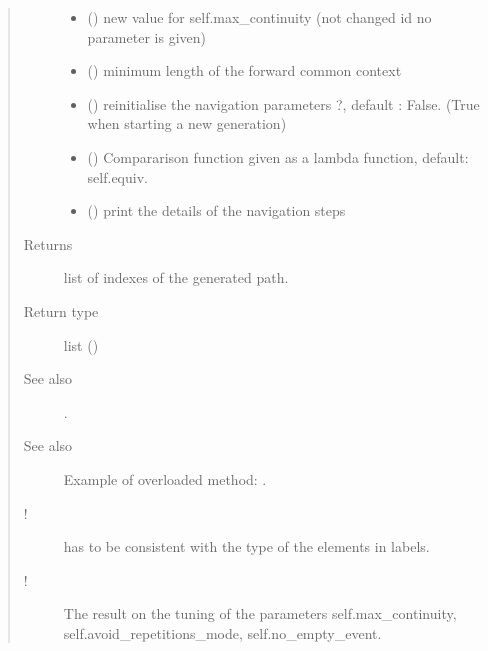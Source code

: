 \documentclass[letterpaper,10pt,english]{sphinxmanual}
\begin{document}
\begin{fulllineitems}
\begin{fulllineitems}
\begin{quote}
\begin{description}
\begin{itemize}
\item {} 
 () \textendash{} new value for self.max\_continuity (not changed id no parameter is given)

\item {} 
 () \textendash{} minimum length of the forward common context

\item {} 
 () \textendash{} reinitialise the navigation parameters ?, default : False. (True when starting a new generation)

\item {} 
 () \textendash{} Compararison function given as a lambda function, default: self.equiv.

\item {} 
 () \textendash{} print the details of the navigation steps

\end{itemize}

\item[{Returns}] \leavevmode
list of indexes of the generated path.

\item[{Return type}] \leavevmode
list ()

\item[{See also}] \leavevmode
{\hyperref[\detokenize{index:Navigator.Navigator.free_generation}]{}}.

\item[{See also}] \leavevmode
Example of overloaded method: .

\item[{!}] \leavevmode
{} has to be consistent with the type of the elements in labels.

\item[{!}] \leavevmode
The result  on the tuning of the parameters self.max\_continuity, self.avoid\_repetitions\_mode, self.no\_empty\_event.


\end{description}
\end{quote}
\end{fulllineitems}
\end{fulllineitems}
\end{document}
